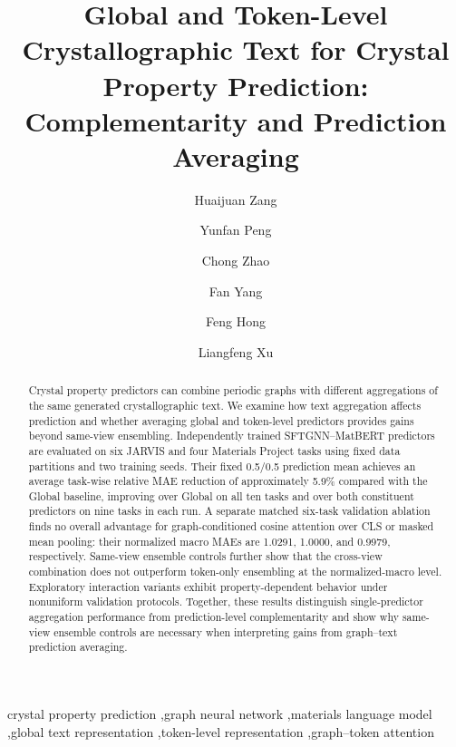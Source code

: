 \documentclass[a4paper,fleqn]{cas-sc}
\begin{document}
\title[mode=title]{Global and Token-Level Crystallographic Text for Crystal Property Prediction: Complementarity and Prediction Averaging}
\author[1]{Huaijuan Zang}
\author[1]{Yunfan Peng}\cormark[1]
\author[2]{Chong Zhao}
\author[1]{Fan Yang}
\author[3]{Feng Hong}
\author[1]{Liangfeng Xu}

\begin{abstract}
Crystal property predictors can combine periodic graphs with different aggregations of the same generated crystallographic text. We examine how text aggregation affects prediction and whether averaging global and token-level predictors provides gains beyond same-view ensembling. Independently trained SFTGNN--MatBERT predictors are evaluated on six JARVIS and four Materials Project tasks using fixed data partitions and two training seeds. Their fixed 0.5/0.5 prediction mean achieves an average task-wise relative MAE reduction of approximately 5.9\% compared with the Global baseline, improving over Global on all ten tasks and over both constituent predictors on nine tasks in each run. A separate matched six-task validation ablation finds no overall advantage for graph-conditioned cosine attention over CLS or masked mean pooling: their normalized macro MAEs are 1.0291, 1.0000, and 0.9979, respectively. Same-view ensemble controls further show that the cross-view combination does not outperform token-only ensembling at the normalized-macro level. Exploratory interaction variants exhibit property-dependent behavior under nonuniform validation protocols. Together, these results distinguish single-predictor aggregation performance from prediction-level complementarity and show why same-view ensemble controls are necessary when interpreting gains from graph--text prediction averaging.
\end{abstract}
\begin{keywords}crystal property prediction \sep graph neural network \sep materials language model \sep global text representation \sep token-level representation \sep graph--token attention
\end{keywords}
\maketitle
\end{document}
